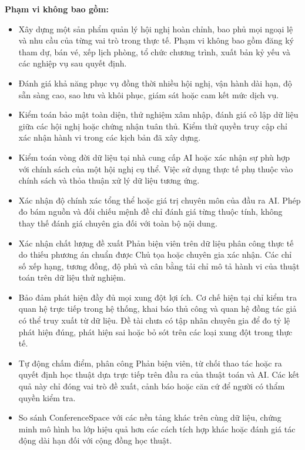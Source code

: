 \textbf{Phạm vi không bao gồm:}

\begin{itemize}
\item Xây dựng một sản phẩm quản lý hội nghị hoàn chỉnh, bao phủ mọi ngoại lệ và nhu cầu của từng vai trò trong thực tế. Phạm vi không bao gồm đăng ký tham dự, bán vé, xếp lịch phòng, tổ chức chương trình, xuất bản kỷ yếu và các nghiệp vụ sau quyết định.
\item Đánh giá khả năng phục vụ đồng thời nhiều hội nghị, vận hành dài hạn, độ sẵn sàng cao, sao lưu và khôi phục, giám sát hoặc cam kết mức dịch vụ.
\item Kiểm toán bảo mật toàn diện, thử nghiệm xâm nhập, đánh giá cô lập dữ liệu giữa các hội nghị hoặc chứng nhận tuân thủ. Kiểm thử quyền truy cập chỉ xác nhận hành vi trong các kịch bản đã xây dựng.
\item Kiểm toán vòng đời dữ liệu tại nhà cung cấp AI hoặc xác nhận sự phù hợp với chính sách của một hội nghị cụ thể. Việc sử dụng thực tế phụ thuộc vào chính sách và thỏa thuận xử lý dữ liệu tương ứng.
\item Xác nhận độ chính xác tổng thể hoặc giá trị chuyên môn của đầu ra AI. Phép đo bám nguồn và đối chiếu mệnh đề chỉ đánh giá từng thuộc tính, không thay thế đánh giá chuyên gia đối với toàn bộ nội dung.
\item Xác nhận chất lượng đề xuất Phản biện viên trên dữ liệu phân công thực tế do thiếu phương án chuẩn được Chủ tọa hoặc chuyên gia xác nhận. Các chỉ số xếp hạng, tương đồng, độ phủ và cân bằng tải chỉ mô tả hành vi của thuật toán trên dữ liệu thử nghiệm.
\item Bảo đảm phát hiện đầy đủ mọi xung đột lợi ích. Cơ chế hiện tại chỉ kiểm tra quan hệ trực tiếp trong hệ thống, khai báo thủ công và quan hệ đồng tác giả có thể truy xuất từ dữ liệu. Đề tài chưa có tập nhãn chuyên gia để đo tỷ lệ phát hiện đúng, phát hiện sai hoặc bỏ sót trên các loại xung đột trong thực tế.
\item Tự động chấm điểm, phân công Phản biện viên, từ chối thao tác hoặc ra quyết định học thuật dựa trực tiếp trên đầu ra của thuật toán và AI. Các kết quả này chỉ đóng vai trò đề xuất, cảnh báo hoặc căn cứ để người có thẩm quyền kiểm tra.
\item So sánh ConferenceSpace với các nền tảng khác trên cùng dữ liệu, chứng minh mô hình ba lớp hiệu quả hơn các cách tích hợp khác hoặc đánh giá tác động dài hạn đối với cộng đồng học thuật.
\end{itemize}

